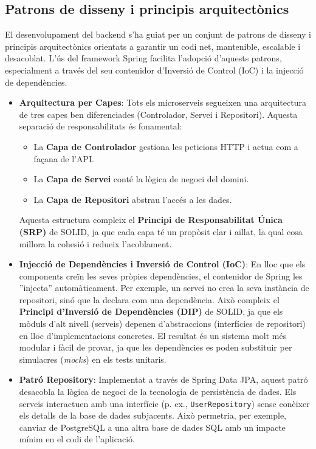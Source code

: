 \subsection{Patrons de disseny i principis arquitectònics}
El desenvolupament del backend s'ha guiat per un conjunt de patrons de disseny i principis arquitectònics orientats a garantir un codi net, mantenible, escalable i desacoblat. L'ús del framework Spring facilita l'adopció d'aquests patrons, especialment a través del seu contenidor d'Inversió de Control (IoC) i la injecció de dependències.

\begin{itemize}
    \item \textbf{Arquitectura per Capes}: Tots els microserveis segueixen una arquitectura de tres capes ben diferenciades (Controlador, Servei i Repositori). Aquesta separació de responsabilitats és fonamental:
    \begin{itemize}
        \item La \textbf{Capa de Controlador} gestiona les peticions HTTP i actua com a façana de l'API.
        \item La \textbf{Capa de Servei} conté la lògica de negoci del domini.
        \item La \textbf{Capa de Repositori} abstrau l'accés a les dades.
    \end{itemize}
    Aquesta estructura compleix el \textbf{Principi de Responsabilitat Única (SRP)} de SOLID, ja que cada capa té un propòsit clar i aïllat, la qual cosa millora la cohesió i redueix l'acoblament.

    \item \textbf{Injecció de Dependències i Inversió de Control (IoC)}: En lloc que els components creïn les seves pròpies dependències, el contenidor de Spring les ''injecta'' automàticament. Per exemple, un servei no crea la seva instància de repositori, sinó que la declara com una dependència. Això compleix el \textbf{Principi d'Inversió de Dependències (DIP)} de SOLID, ja que els mòduls d'alt nivell (serveis) depenen d'abstraccions (interfícies de repositori) en lloc d'implementacions concretes. El resultat és un sistema molt més modular i fàcil de provar, ja que les dependències es poden substituir per simulacres (\textit{mocks}) en els tests unitaris.

    \item \textbf{Patró Repository}: Implementat a través de Spring Data JPA, aquest patró desacobla la lògica de negoci de la tecnologia de persistència de dades. Els serveis interactuen amb una interfície (p. ex., \texttt{UserRepository}) sense conèixer els detalls de la base de dades subjacents. Això permetria, per exemple, canviar de PostgreSQL a una altra base de dades SQL amb un impacte mínim en el codi de l'aplicació.


\end{itemize}
